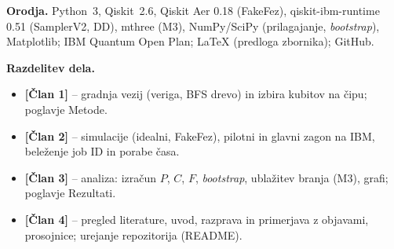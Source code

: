 \documentclass[10pt,a4paper]{article}
\begin{document}
\textbf{Orodja.} Python~3, Qiskit~2.6, Qiskit Aer 0.18 (FakeFez), qiskit-ibm-runtime 0.51 (SamplerV2, DD), mthree (M3), 
NumPy/SciPy (prilagajanje, \emph{bootstrap}), Matplotlib; IBM Quantum Open Plan; \LaTeX{} (predloga zbornika); GitHub.\par

\textbf{Razdelitev dela.}
\begin{itemize}
\item \textbf{[Član 1]} -- gradnja vezij (veriga, BFS drevo) in izbira kubitov na čipu; poglavje Metode.
\item \textbf{[Član 2]} -- simulacije (idealni, FakeFez), pilotni in glavni zagon na IBM, beleženje job ID in porabe časa.
\item \textbf{[Član 3]} -- analiza: izračun $P$, $C$, $F$, \emph{bootstrap}, ublažitev branja (M3), grafi; poglavje Rezultati.
\item \textbf{[Član 4]} -- pregled literature, uvod, razprava in primerjava z objavami, prosojnice; urejanje repozitorija (README).
\end{itemize}
\end{document}
